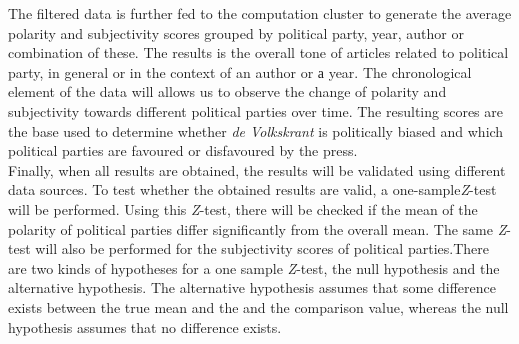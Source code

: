 The filtered data is further fed to the computation cluster to generate the average polarity and subjectivity scores grouped by political party, year, author or combination of these. The results is the overall tone of articles related to political party, in general or in the context of an author or а year. The chronological element of the data will allows us to observe the change of polarity and subjectivity towards different political parties over time. The resulting scores are the base used to determine whether {\it de Volkskrant} is politically biased and which political parties are favoured or disfavoured by the press. \\

Finally, when all results are obtained, the results will be validated using different data sources. To test whether the obtained results are valid, a one-sample{\it Z}-test will be performed. Using this {\it Z}-test, there will be checked if the mean of the polarity of political parties differ significantly from the overall mean. The same {\it Z}-test will also be performed for the subjectivity scores of political parties.There are two kinds of hypotheses for a one sample {\it Z}-test, the null hypothesis and the alternative hypothesis. The alternative hypothesis assumes that some difference exists between the true mean and the and the comparison value, whereas the null hypothesis assumes that no difference exists.